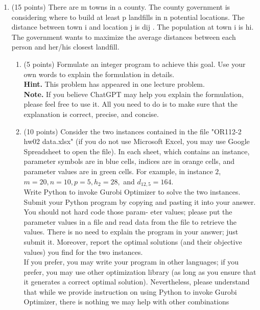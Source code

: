\documentclass[12pt]{article}
\begin{document}
\begin{enumerate}
      \item (15 points) There are m towns in a county. The county government is considering where to build at least p landfills in n potential locations. The distance between town i and location j is dij . The population at town i is hi. The government wants to maximize the average distances between each person and her/his closest landfill.
            \begin{enumerate}
                  \item (5 points) Formulate an integer program to achieve this goal. Use your own words to explain the formulation in details.\\
                        \textbf{Hint.} This problem has appeared in one lecture problem.\\
                        \textbf{Note.} If you believe ChatGPT may help you explain the formulation, please feel free to use it. All you need to do is to make sure that the explanation is correct, precise, and concise.
                  \item (10 points) Consider the two instances contained in the file "OR112-2 hw02 data.xlsx" (if you do not use Microsoft Excel, you may use Google Spreadsheet to open the file). In each sheet, which contains an instance, parameter symbols are in blue cells, indices are in orange cells, and parameter values are in green cells. For example, in instance $2$, $m = 20, n = 10, p = 5, h_2 = 28,$ and $d_{12,5} = 164$.\\
                        Write Python to invoke Gurobi Optimizer to solve the two instances. Submit your Python
                        program by copying and pasting it into your answer. You should not hard code those param-
                        eter values; please put the parameter values in a file and read data from the file to retrieve
                        the values. There is no need to explain the program in your answer; just submit it. Moreover,
                        report the optimal solutions (and their objective values) you find for the two instances.\\
                        If you prefer, you may write your program in other languages; if you prefer, you may use
                        other optimization library (as long as you ensure that it generates a correct optimal solution).
                        Nevertheless, please understand that while we provide instruction on using Python to invoke
                        Gurobi Optimizer, there is nothing we may help with other combinations

\end{enumerate}
\end{enumerate}
\end{document}
